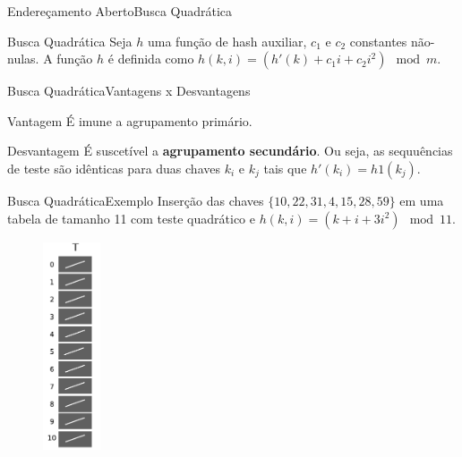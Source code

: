 \documentclass[aspectratio=169]{beamer}
\begin{document}

\begin{frame}{Endereçamento Aberto}{Busca Quadrática}
\begin{block}{Busca Quadrática}
Seja $h$ uma função de hash auxiliar, $c_1$ e $c_2$ constantes não-nulas. A função $h$ é definida como $h(k, i) = (h' (k) + c_1 i + c_2 i^2 ) \mod m$.
\end{block}
\end{frame}

\begin{frame}{Busca Quadrática}{Vantagens x Desvantagens}
\begin{block}{Vantagem}
É imune a agrupamento primário.
\end{block}
\begin{block}{Desvantagem}
É suscetível a {\bf agrupamento secundário}. Ou seja, as sequuências de teste são idênticas para duas chaves $k_i$ e $k_j$ tais que $h' (k_i ) = h1 (k_j )$.
\end{block} 
\end{frame}


\begin{frame}{Busca Quadrática}{Exemplo}
Inserção das chaves $\{10, 22, 31, 4, 15, 28, 59\}$ em uma tabela de tamanho 11 com teste quadrático e $h(k, i) = (k + i + 3i^2 ) \mod 11$.
\begin{figure}[!h]
  \centering
  \includegraphics[width=48pt]{imagens/ex_end_aberto_quadratico1.png}
  \label{fig_ex_end_aberto_quadratico1}
\end{figure}
\end{frame}
\end{document}
